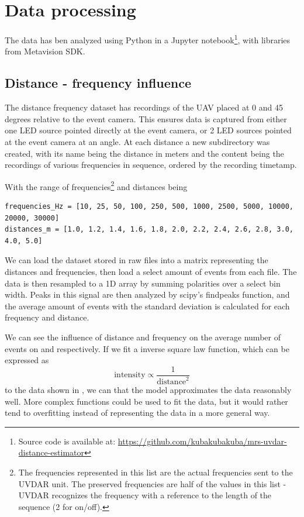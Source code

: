 
\chapter{Data processing\label{chap:data_processing}}

The data has ben analyzed using Python in a Jupyter notebook\footnote{Source code is available at: \url{https://github.com/kubakubakuba/mrs-uvdar-distance-estimator}}, with libraries from Metavision SDK.

\section{Distance - frequency influence}

The distance frequency dataset has recordings of the UAV placed at 0 and 45 degrees relative to the event camera. This ensures data is captured from either
one LED source pointed directly at the event camera, or 2 LED sources pointed at the event camera at an angle. At each distance a new subdirectory was
created, with its name being the distance in meters and the content being the recordings of various frequencies in sequence, ordered by the recording timetamp.

With the range of frequencies\footnote{The frequencies represented in this list are the actual frequencies sent to the UVDAR unit. The preserved frequencies
are half of the values in this list - UVDAR recognizes the frequency with a reference to the length of the sequence (2 for on/off).} and distances being

\begin{lstlisting}
frequencies_Hz = [10, 25, 50, 100, 250, 500, 1000, 2500, 5000, 10000, 20000, 30000]
distances_m = [1.0, 1.2, 1.4, 1.6, 1.8, 2.0, 2.2, 2.4, 2.6, 2.8, 3.0, 4.0, 5.0]
\end{lstlisting}

We can load the dataset stored in raw files into a matrix representing the distances and frequencies, then load a select amount of events from each file.
The data is then resampled to a 1D array by summing polarities over a select bin width. Peaks in this signal are then analyzed by scipy's findpeaks function,
and the average amount of events with the standard deviation is calculated for each frequency and distance.

We can see the influence of distance and frequency on the average number of events on
 and  respectively. If we fit a inverse square law function,
which can be expressed as
\begin{equation}
	\text{intensity} \propto \frac{1}{\text{distance}^2}
\end{equation}
to the data shown in , we can that the model approximates the data reasonably well.
More complex functions could be used to fit the data, but it would rather tend to overfitting instead
of representing the data in a more general way.

